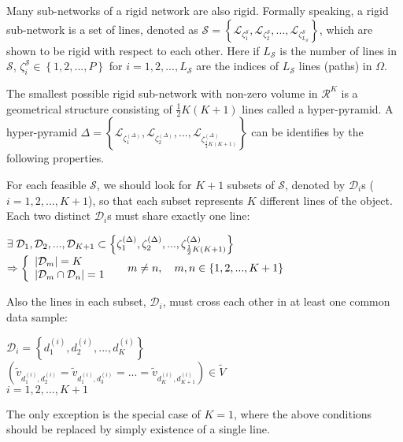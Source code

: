 \documentclass[10pt,journal,cspaper,compsoc]{IEEEtran}
\begin{document}
Many sub-networks of a rigid network are also rigid. Formally speaking, a rigid sub-network is a set of lines, denoted as $\mathcal{S}=\left\{\mathcal{L}_{\zeta_1^{\mathcal{S}}},\mathcal{L}_{\zeta_2^{\mathcal{S}}},...,\mathcal{L}_{\zeta_{L_\mathcal{S}}^{\mathcal{S}}}\right\}$,  which are shown to be rigid with respect to each other. Here if $L_\mathcal{S}$ is the number of lines in $\mathcal{S}$, $\zeta_i^{\mathcal{S}}\in\left\{1,2,...,P\right\}$ for $i=1,2,...,L_\mathcal{S}$ are the indices of $L_\mathcal{S}$ lines (paths) in $\Omega$.

\begin{framed}
\begin{myTheorem}
The smallest possible rigid sub-network with non-zero volume in $\mathcal{R}^K$ is a geometrical structure consisting of $\frac{1}{2}K(K+1)$ lines called a hyper-pyramid. A hyper-pyramid $\Delta= \left\{\mathcal{L}_{\zeta_1^{(\Delta)}},\mathcal{L}_{\zeta_2^{(\Delta)}},...,\mathcal{L}_{\zeta_{\frac{1}{2}K(K+1)}^{(\Delta)}}\right\}$ can be identifies by the following properties.

\vspace{3mm}
For each feasible $\mathcal{S}$, we should look for $K+1$ subsets of $\mathcal{S}$, denoted by $\mathcal{D}_i$s ($i=1,2,...,K+1$), so that each subset represents $K$ different lines of the object. Each two distinct $\mathcal{D}_i$s must share exactly one line:
\begin{center}
$\exists\hspace{1mm}\mathcal{D}_1,\mathcal{D}_2,...,\mathcal{D}_{K+1}\subset \left\{\zeta_1^{(\Delta)},\zeta_2^{(\Delta)},...,\zeta_{\frac{1}{2}K(K+1)}^{(\Delta)}\right\}$\\
\vspace{3mm}
$\Rightarrow 
\left\{
\begin{array}{l l}
|\mathcal{D}_m|=K \\
|\mathcal{D}_m\cap\mathcal{D}_n|=1
\end{array} \right.\
\quad m\neq n, \quad  m,n\in\left\{1,2,...,K+1\right\}$
\end{center}
Also the lines in each subset, $\mathcal{D}_i$, must cross each other in at least one common data sample:
\begin{center}
$\mathcal{D}_i=\left\{d_1^{(i)},d_2^{(i)},...,d_K^{(i)}\right\}$\\
$(\tilde{v}_{d_1^{(i)},d_2^{(i)}}=\tilde{v}_{d_1^{(i)},d_3^{(i)}}=...=\tilde{v}_{d_K^{(i)},d_{K+1}^{(i)}})\in \tilde{V}$\\ \vspace{1mm}
$i=1,2,...,K+1$
\end{center}
\vspace{3mm}
The only exception is the special case of $K=1$, where the above conditions should be replaced by simply existence of a single line.
\end{myTheorem}
\end{framed}
\end{document}
